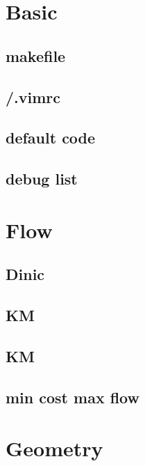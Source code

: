 \section{Basic}

% 
\subsection{makefile}

\subsection{/.vimrc}

\subsection{default code}

\subsection{debug list}


\section{Flow}

\subsection{Dinic}

\subsection{KM}

\subsection{KM}

\subsection{min cost max flow}


\section{Geometry}

